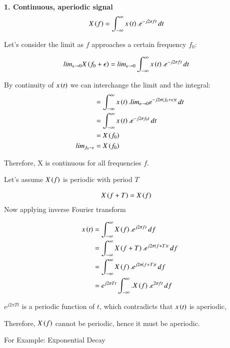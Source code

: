 \documentclass[journal,12pt,onecolumn]{IEEEtran}
\theoremstyle{remark}
\begin{document}
\newpage
\textbf{1. Continuous, aperiodic signal}\\

\begin{align}
X\left(f\right)&=\int_{-\infty}^{\infty} x\left(t\right).e^{-j2\pi ft}\,dt
\end{align}

Let's consider the limit as $f$ approaches a certain frequency $f_0$:

\begin{align}
lim_{\epsilon \rightarrow 0}X\left(f_0+\epsilon\right)&= lim_{\epsilon \rightarrow 0}\int_{-\infty}^{\infty} x\left(t\right).e^{-j2\pi ft}\,dt
\end{align}

By continuity of $x\left(t\right)$ we can interchange the limit and the integral:
\begin{align}
&=\int_{-\infty}^{\infty} x\left(t\right).lim_{\epsilon\rightarrow0}e^{-j2\pi\left(f_0+\epsilon\right)t}\,dt\\
&=\int_{-\infty}^{\infty} x\left(t\right).e^{-j2\pi f_0 t}\,dt\\
&=X\left(f_0\right)\\
 lim_{f_0-\epsilon}&=X\left(f_0\right)
\end{align}

Therefore, X is continuous for all frequencies $f$.

Let's assume $X\left(f\right)$ is periodic with period $T$ 

\begin{align}
X\left(f+T\right)&=X\left(f\right)
\end{align}
Now applying inverse Fourier transform

\begin{align}
x\left(t\right)&=\int_{-\infty}^{\infty} X\left(f\right).e^{j2\pi ft}\,df\\
&=\int_{-\infty}^{\infty} X\left(f+T\right).e^{j2\pi \left(f+T\right)t}\,df\\
&=\int_{-\infty}^{\infty} X\left(f\right).e^{j2\pi \left(f+T\right)t}\,df\\
&=e^{j2\pi Tt}\int_{-\infty}^{\infty}.X\left(f\right).e^{2\pi ft}\, df
\end{align}

$e^{j2\pi Tt}$ is a periodic function of $t$, which contradicts that $x\left(t\right)$ is aperiodic,

Therefore, $X\left(f\right)$ cannot be periodic, hence it must be aperiodic.\\
\vspace{2mm}


For Example: Exponential Decay\\
\end{document}
